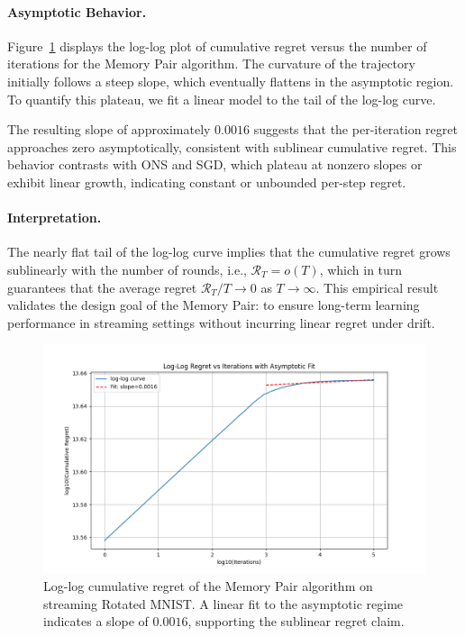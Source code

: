\documentclass[a4paper,12pt]{article}
\begin{document}
\paragraph{Asymptotic Behavior.} Figure~\ref{fig:enter-label} displays the log-log plot of cumulative regret versus the number of iterations for the Memory Pair algorithm. The curvature of the trajectory initially follows a steep slope, which eventually flattens in the asymptotic region. To quantify this plateau, we fit a linear model to the tail of the log-log curve.

The resulting slope of approximately $0.0016$ suggests that the per-iteration regret approaches zero asymptotically, consistent with sublinear cumulative regret. This behavior contrasts with ONS and SGD, which plateau at nonzero slopes or exhibit linear growth, indicating constant or unbounded per-step regret.

\paragraph{Interpretation.} The nearly flat tail of the log-log curve implies that the cumulative regret grows sublinearly with the number of rounds, i.e., $\mathcal{R}_T = o(T)$, which in turn guarantees that the average regret $\mathcal{R}_T / T \to 0$ as $T \to \infty$. This empirical result validates the design goal of the Memory Pair: to ensure long-term learning performance in streaming settings without incurring linear regret under drift.

\begin{figure}
\centering
\includegraphics[width=1\linewidth]{rotmnist_drift_memorypair_loglog_fit.png}
\caption{Log-log cumulative regret of the Memory Pair algorithm on streaming Rotated MNIST. A linear fit to the asymptotic regime indicates a slope of $0.0016$, supporting the sublinear regret claim.}
\label{fig:enter-label}
\end{figure}
\end{document}
